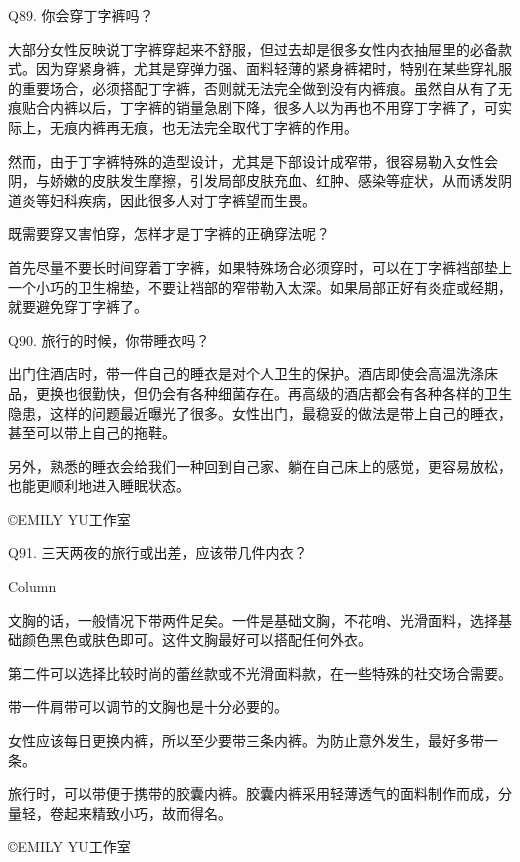 \documentclass[12pt,UTF8]{ctexbook}
\begin{document}
Q89. 你会穿丁字裤吗？


大部分女性反映说丁字裤穿起来不舒服，但过去却是很多女性内衣抽屉里的必备款式。因为穿紧身裤，尤其是穿弹力强、面料轻薄的紧身裤裙时，特别在某些穿礼服的重要场合，必须搭配丁字裤，否则就无法完全做到没有内裤痕。虽然自从有了无痕贴合内裤以后，丁字裤的销量急剧下降，很多人以为再也不用穿丁字裤了，可实际上，无痕内裤再无痕，也无法完全取代丁字裤的作用。

然而，由于丁字裤特殊的造型设计，尤其是下部设计成窄带，很容易勒入女性会阴，与娇嫩的皮肤发生摩擦，引发局部皮肤充血、红肿、感染等症状，从而诱发阴道炎等妇科疾病，因此很多人对丁字裤望而生畏。


既需要穿又害怕穿，怎样才是丁字裤的正确穿法呢？

首先尽量不要长时间穿着丁字裤，如果特殊场合必须穿时，可以在丁字裤裆部垫上一个小巧的卫生棉垫，不要让裆部的窄带勒入太深。如果局部正好有炎症或经期，就要避免穿丁字裤了。





Q90. 旅行的时候，你带睡衣吗？


出门住酒店时，带一件自己的睡衣是对个人卫生的保护。酒店即使会高温洗涤床品，更换也很勤快，但仍会有各种细菌存在。再高级的酒店都会有各种各样的卫生隐患，这样的问题最近曝光了很多。女性出门，最稳妥的做法是带上自己的睡衣，甚至可以带上自己的拖鞋。

另外，熟悉的睡衣会给我们一种回到自己家、躺在自己床上的感觉，更容易放松，也能更顺利地进入睡眠状态。

©EMILY YU工作室





Q91. 三天两夜的旅行或出差，应该带几件内衣？



Column

文胸的话，一般情况下带两件足矣。一件是基础文胸，不花哨、光滑面料，选择基础颜色黑色或肤色即可。这件文胸最好可以搭配任何外衣。

第二件可以选择比较时尚的蕾丝款或不光滑面料款，在一些特殊的社交场合需要。

带一件肩带可以调节的文胸也是十分必要的。


女性应该每日更换内裤，所以至少要带三条内裤。为防止意外发生，最好多带一条。

旅行时，可以带便于携带的胶囊内裤。胶囊内裤采用轻薄透气的面料制作而成，分量轻，卷起来精致小巧，故而得名。





©EMILY YU工作室
\end{document}
